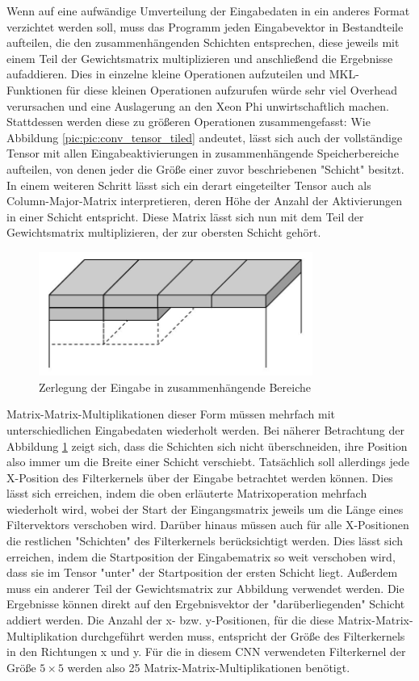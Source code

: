 \documentclass[../main.tex]{subfiles}
\begin{document}
Wenn auf eine aufwändige Umverteilung der Eingabedaten in ein anderes Format verzichtet werden soll, muss das Programm jeden Eingabevektor in Bestandteile aufteilen, die den zusammenhängenden Schichten entsprechen, diese jeweils mit einem Teil der Gewichtsmatrix multiplizieren und anschließend die Ergebnisse aufaddieren. Dies in einzelne kleine Operationen aufzuteilen und MKL-Funktionen für diese kleinen Operationen aufzurufen würde sehr viel Overhead verursachen und eine Auslagerung an den Xeon Phi unwirtschaftlich machen. Stattdessen werden diese zu größeren Operationen zusammengefasst: Wie Abbildung \ref{pic:pic:conv_tensor_tiled} andeutet, lässt sich auch der vollständige Tensor mit allen Eingabeaktivierungen in zusammenhängende Speicherbereiche aufteilen, von denen jeder die Größe einer zuvor beschriebenen "Schicht" besitzt. In einem weiteren Schritt lässt sich ein derart eingeteilter Tensor auch als Column-Major-Matrix interpretieren, deren Höhe der Anzahl der Aktivierungen in einer Schicht entspricht. Diese Matrix lässt sich nun mit dem Teil der Gewichtsmatrix multiplizieren, der zur obersten Schicht gehört. 
\begin{figure}
	\centering 
	\includegraphics[width=0.8\textwidth]{../images/Schmidt/convTensor2.jpg} 
	\caption {Zerlegung der Eingabe in zusammenhängende Bereiche}
	\label{pic:conv_tensor_tiled} 
\end{figure} 
Matrix-Matrix-Multiplikationen dieser Form müssen mehrfach mit unterschiedlichen Eingabedaten wiederholt werden. Bei näherer Betrachtung der Abbildung \ref{pic:conv_tensor_tiled} zeigt sich, dass die Schichten sich nicht überschneiden, ihre Position also immer um die Breite einer Schicht verschiebt. Tatsächlich soll allerdings jede X-Position des Filterkernels über der Eingabe betrachtet werden können. Dies lässt sich erreichen, indem die oben erläuterte Matrixoperation mehrfach wiederholt wird, wobei der Start der Eingangsmatrix jeweils um die Länge eines Filtervektors verschoben wird. Darüber hinaus müssen auch für alle X-Positionen die restlichen "Schichten" des Filterkernels berücksichtigt werden. Dies lässt sich erreichen, indem die Startposition der Eingabematrix so weit verschoben wird, dass sie im Tensor "unter" der Startposition der ersten Schicht liegt. Außerdem muss ein anderer Teil der Gewichtsmatrix zur Abbildung verwendet werden. Die Ergebnisse können direkt auf den Ergebnisvektor der "darüberliegenden" Schicht addiert werden. Die Anzahl der x- bzw. y-Positionen, für die diese Matrix-Matrix-Multiplikation durchgeführt werden muss, entspricht der Größe des Filterkernels in den Richtungen x und y. Für die in diesem CNN verwendeten Filterkernel der Größe \(5\times5\) werden also 25 Matrix-Matrix-Multiplikationen benötigt. 
\end{document}
